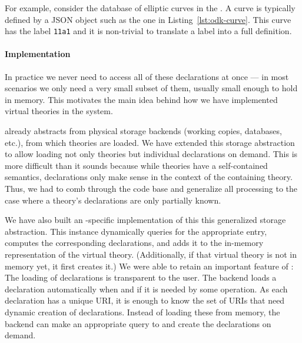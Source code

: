 

For example, consider the database of elliptic curves in the \LMFDB.
A curve is typically defined by a JSON object such as the one in Listing~\ref{lst:odk-curve}.
This curve has the label \texttt{11a1} and it is non-trivial to translate a label into a full definition.

\paragraph{Implementation}
In practice we never need to access all of these declarations at once --- in most
scenarios we only need a very small subset of them, usually small enough to hold in memory.
This motivates the main idea behind how we have implemented virtual theories in the \MMT system.

\MMT already abstracts from physical storage backends (working copies, databases, etc.), from which theories are loaded.
We have extended this storage abstraction to allow loading not only theories but individual declarations on demand.
This is more difficult than it sounds because while theories have a self-contained semantics, declarations only make sense in the context of the containing theory.
Thus, we had to comb through the \MMT code base and generalize all processing to the case where a theory's declarations are only partially known.

We have also built an \LMFDB-specific implementation of this this generalized storage abstraction.
This instance dynamically queries \LMFDB for the appropriate entry, computes the corresponding declarations, and adds it to the in-memory representation of the virtual theory.
(Additionally, if that virtual theory is not in memory yet, it first creates it.)
We were able to retain an important feature of \MMT: The loading of declarations is transparent to the user.
The backend loads a declaration automatically when and if it is needed by some operation.
As each declaration has a unique URI, it is enough to know the set of URIs that need dynamic creation of declarations.
Instead of loading these from memory, the backend can make an appropriate query to \LMFDB and create the declarations on demand.



